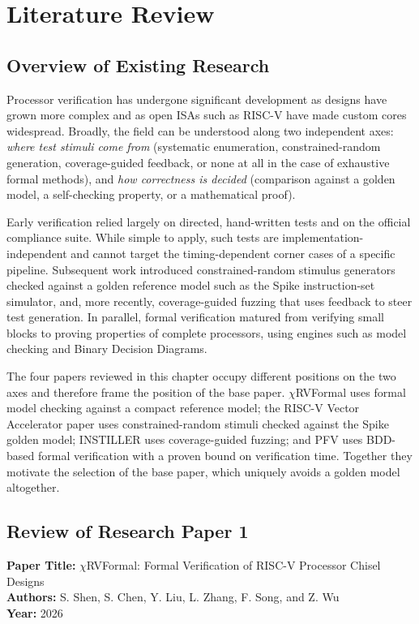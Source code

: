 \documentclass[12pt,a4paper]{report}
\begin{document}
\chapter{Literature Review}

\section{Overview of Existing Research}
Processor verification has undergone significant development as designs have grown more
complex and as open ISAs such as RISC-V have made custom cores widespread. Broadly, the
field can be understood along two independent axes: \emph{where test stimuli come from}
(systematic enumeration, constrained-random generation, coverage-guided feedback, or none
at all in the case of exhaustive formal methods), and \emph{how correctness is decided}
(comparison against a golden model, a self-checking property, or a mathematical proof).

Early verification relied largely on directed, hand-written tests and on the official
compliance suite. While simple to apply, such tests are implementation-independent and
cannot target the timing-dependent corner cases of a specific pipeline. Subsequent work
introduced constrained-random stimulus generators checked against a golden reference model
such as the Spike instruction-set simulator, and, more recently, coverage-guided fuzzing
that uses feedback to steer test generation. In parallel, formal verification matured from
verifying small blocks to proving properties of complete processors, using engines such as
model checking and Binary Decision Diagrams.

The four papers reviewed in this chapter occupy different positions on the two axes and
therefore frame the position of the base paper. $\chi$RVFormal uses formal model checking
against a compact reference model; the RISC-V Vector Accelerator paper uses
constrained-random stimuli checked against the Spike golden model; INSTILLER uses
coverage-guided fuzzing; and PFV uses BDD-based formal verification with a proven bound on
verification time. Together they motivate the selection of the base paper, which uniquely
avoids a golden model altogether.

\section{Review of Research Paper 1}
\noindent\textbf{Paper Title:} $\chi$RVFormal: Formal Verification of RISC-V Processor
Chisel Designs\\
\textbf{Authors:} S. Shen, S. Chen, Y. Liu, L. Zhang, F. Song, and Z. Wu\\
\textbf{Year:} 2026
\end{document}
